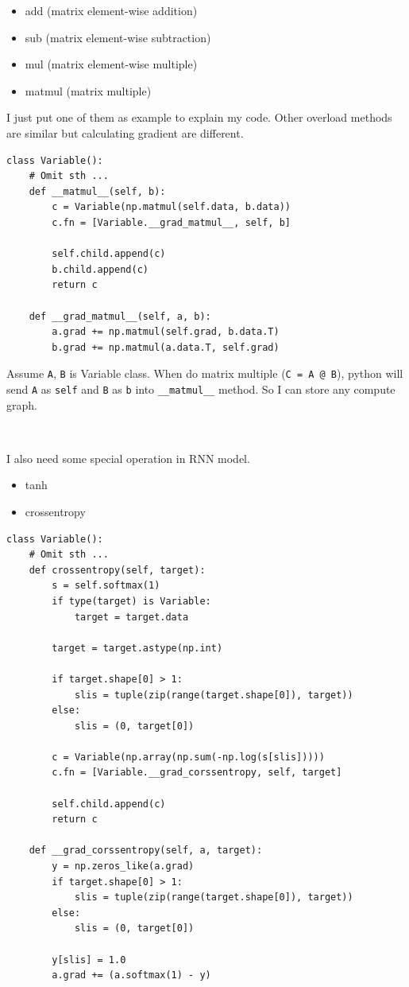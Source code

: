 \documentclass[12pt]{article}
\begin{document}
\begin{itemize}
\item add (matrix element-wise addition)
\item sub (matrix element-wise subtraction)
\item mul (matrix element-wise multiple)
\item matmul (matrix multiple)
\end{itemize}

I just put one of them as example to explain my code. Other overload methods are similar but calculating gradient are different. 

\begin{verbatim}
class Variable():
    # Omit sth ...
    def __matmul__(self, b):
        c = Variable(np.matmul(self.data, b.data))
        c.fn = [Variable.__grad_matmul__, self, b]
           
        self.child.append(c)
        b.child.append(c)
        return c
    
    def __grad_matmul__(self, a, b):
        a.grad += np.matmul(self.grad, b.data.T)
        b.grad += np.matmul(a.data.T, self.grad)
\end{verbatim}

Assume \verb|A|, \verb|B| is Variable class. When do matrix multiple (\verb|C = A @ B|), python will send \verb|A| as \verb|self| and \verb|B| as \verb|b| into \verb|__matmul__| method. So I can store any compute graph.
\par \ \par

I also need some special operation in RNN model.

\begin{itemize}
\item tanh    
\item crossentropy
\end{itemize}

\begin{verbatim}
class Variable():
    # Omit sth ...
    def crossentropy(self, target):
        s = self.softmax(1)
        if type(target) is Variable:
            target = target.data
            
        target = target.astype(np.int)
        
        if target.shape[0] > 1:
            slis = tuple(zip(range(target.shape[0]), target))
        else:
            slis = (0, target[0])
        
        c = Variable(np.array(np.sum(-np.log(s[slis]))))
        c.fn = [Variable.__grad_corssentropy, self, target]
        
        self.child.append(c)
        return c
    
    def __grad_corssentropy(self, a, target):
        y = np.zeros_like(a.grad)
        if target.shape[0] > 1:
            slis = tuple(zip(range(target.shape[0]), target))
        else:
            slis = (0, target[0])
            
        y[slis] = 1.0
        a.grad += (a.softmax(1) - y)
\end{verbatim}
\end{document}
